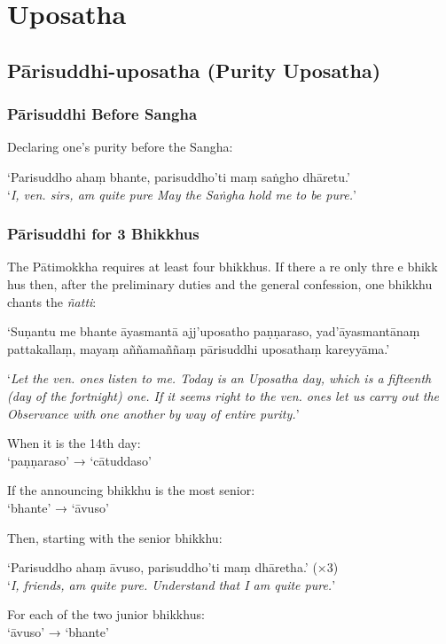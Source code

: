 \chapter{Uposatha}

\section{Pārisuddhi-uposatha (Purity Uposatha)}

\subsection{Pārisuddhi Before Sangha}

Declaring one's purity before the Sangha:

‘Parisuddho ahaṃ bhante, parisuddho'ti maṃ saṅgho dhāretu.’\\
‘\emph{I, ven. sirs, am quite pure May the Saṅgha hold me to be pure.}’


\subsection{Pārisuddhi for 3 Bhikkhus}

The Pātimokkha requires at least four bhikkhus. If there a re only thre e bhikk
hus then, after the preliminary duties and the general confession, one bhikkhu
chants the \emph{ñatti}:

‘Suṇantu me bhante āyasmantā ajj'uposatho paṇṇaraso, yad'āyasmantānaṃ
pattakallaṃ, mayaṃ aññamaññaṃ pārisuddhi uposathaṃ kareyyāma.’

‘\emph{Let the ven. ones listen to me. Today is an Uposatha day, which is a
  fifteenth (day of the fortnight) one. If it seems right to the ven. ones let
  us carry out the Observance with one another by way of entire purity.}’

When it is the 14th day:\\
‘paṇṇaraso’ → ‘cātuddaso’

If the announcing bhikkhu is the most senior:\\
‘bhante’ → ‘āvuso’ 

Then, starting with the senior bhikkhu:

‘Parisuddho ahaṃ āvuso, parisuddho'ti maṃ dhāretha.’ (×3)\\
‘\emph{I, friends, am quite pure. Understand that I am quite pure.}’

For each of the two junior bhikkhus:\\
‘āvuso’ → ‘bhante’ 

